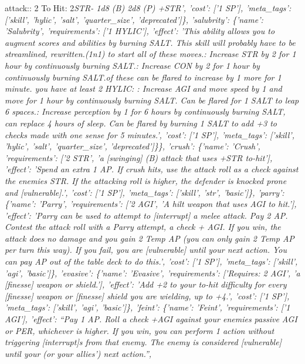 \documentclass[
  letterpaper,
  DIV=11,
  numbers=noendperiod]{scrartcl}
\begin{document}
attack:\nSpeed: 2 To Hit: 2\emph{STR\n- 1d8 (B) 2d8 (P)
+STR', 'cost': {[}'1 SP'{]}, 'meta\_tags': {[}'skill', 'hylic', 'salt',
'quarter\_size', 'deprecated'{]}\}, 'salubrity': \{'name': 'Salubrity',
'requirements': {[}'1 HYLIC'{]}, 'effect': 'This ability allows you to
augment scores and abilities by burning SALT. This skill will probably
have to be streamlined, rewritten.\n(1n1) to start all of these
moves.\nSTR: Increase STR by 2 for 1 hour by continuously burning
SALT.\nCON: Increase CON by 2 for 1 hour by continuously burning
SALT.\nBoth of these can be flared to increase by 1 more for 1 minute.
\nIf you have at least 2 HYLIC: \nAGI: Increase AGI and move speed by 1
and move for 1 hour by continuously burning SALT. Can be flared for 1
SALT to leap 6 spaces.\nPERCEPTION: Increase perception by 1 for 6 hours
by continuously burning SALT, can replace 4 hours of sleep. Can be
flared by burning 1 SALT to add +3 to checks made with one sense for 5
minutes.', 'cost': {[}'1 SP'{]}, 'meta\_tags': {[}'skill', 'hylic',
'salt', 'quarter\_size', 'deprecated'{]}\}\}, 'crush': \{'name':
'Crush', 'requirements': {[}'2 STR', 'a {[}swinging{]} (B) attack that
uses +STR to-hit'{]}, 'effect': 'Spend an extra 1 AP. If crush hits, use
the attack roll as a check against the enemies STR. If the attacking
roll is higher, the defender is knocked prone and {[}vulnerable{]}.',
'cost': {[}'1 SP'{]}, 'meta\_tags': {[}'skill', 'str', 'basic'{]}\},
'parry': \{'name': 'Parry', 'requirements': {[}'2 AGI', 'A hilt weapon
that uses AGI to hit.'{]}, 'effect': 'Parry can be used to attempt to
{[}interrupt{]} a melee attack. Pay 2 AP. Contest the attack roll with a
Parry attempt, a check + AGI. If you win, the attack does no damage and
you gain 2 Temp AP (you can only gain 2 Temp AP per turn this way). If
you fail, you are {[}vulnerable{]} until your next action. You can pay
AP out of the table deck to do this.', 'cost': {[}'1 SP'{]},
'meta\_tags': {[}'skill', 'agi', 'basic'{]}\}, 'evasive': \{'name':
'Evasive', 'requirements': {[}'Requires: 2 AGI', 'a {[}finesse{]} weapon
or shield.'{]}, 'effect': 'Add +2 to your to-hit difficulty for every
{[}finesse{]} weapon or {[}finesse{]} shield you are wielding, up to
+4.', 'cost': {[}'1 SP'{]}, 'meta\_tags': {[}'skill', 'agi',
'basic'{]}\}, 'feint': \{'name': 'Feint', 'requirements': {[}'1 AGI'{]},
'effect': ``Pay 1 AP. Roll a check +AGI against your enemies passive AGI
or PER, whichever is higher. If you win, you can perform 1 action
without triggering {[}interrupt{]}s from that enemy. The enemy is
considered {[}vulnerable{]} until your (or your allies') next action.'',
}
\end{document}
